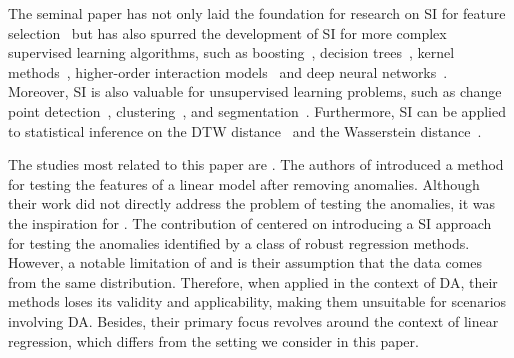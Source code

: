 The seminal paper has not only laid the foundation for research on SI for feature selection~\cite{loftus2014significance, fithian2015selective, tibshirani2016exact, yang2016selective, hyun2018exact, sugiyama2021more, fithian2014optimal, duy2021more} but has also spurred the development of SI for more complex supervised learning algorithms, such as boosting~\cite{rugamer2020inference}, decision trees~\cite{neufeld2022tree}, kernel methods~\cite{yamada2018post}, higher-order interaction models~\cite{suzumura2017selective,das2021fast} and deep neural networks~\cite{duy2022quantifying, miwa2023valid}.
%
Moreover, SI is also valuable for unsupervised learning problems, such as change point detection~\cite{umezu2017selective, hyun2018post, duy2020computing, sugiyama2021valid, jewell2022testing}, clustering~\cite{lee2015evaluating, inoue2017post, gao2022selective, chen2022selective}, and segmentation~\cite{tanizaki2020computing, duy2022quantifying}.
%
Furthermore, SI can be applied to statistical inference on  the DTW distance~\cite{duy2022exact} and the Wasserstein distance~\cite{duy2021exact}.


The studies most related to this paper are \cite{chen2019valid, tsukurimichi2022conditional}.
%
The authors of \cite{chen2019valid} introduced a  method for testing the features of a linear model after removing anomalies.
%
Although their work did not directly address the problem of testing the anomalies, it was the  inspiration for %
\cite{tsukurimichi2022conditional}.
%
The contribution of \cite{tsukurimichi2022conditional} centered on introducing a SI approach for testing the anomalies identified by a class of robust regression methods.
%
However, a notable limitation of \cite{chen2019valid} and \cite{tsukurimichi2022conditional} is their assumption that the data comes from the same distribution.
%
Therefore, when applied in the context of DA, their methods loses its validity and applicability, making them unsuitable for scenarios involving DA.
%
Besides, their primary focus revolves around the context of linear regression, which differs from the setting we consider in this paper. 
